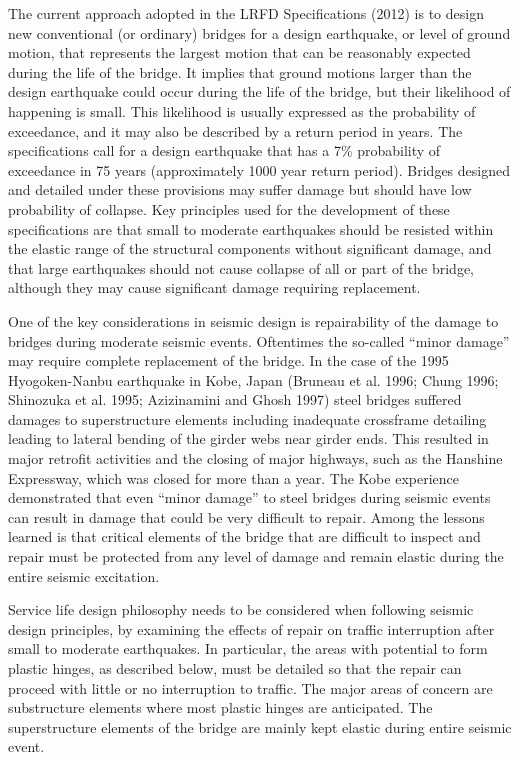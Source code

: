 The current approach adopted in the LRFD Specifications (2012) is to design new conventional (or ordinary)
bridges for a design earthquake, or level of ground motion, that represents the largest motion that can be reasonably
expected during the life of the bridge. It implies that ground motions larger than the design earthquake could occur
during the life of the bridge, but their likelihood of happening is small. This likelihood is usually expressed as the
probability of exceedance, and it may also be described by a return period in years. The specifications call for a
design earthquake that has a 7\% probability of exceedance in 75 years (approximately 1000 year return period).
Bridges designed and detailed under these provisions may suffer damage but should have low probability of collapse.
Key principles used for the development of these specifications are that small to moderate earthquakes should be
resisted within the elastic range of the structural components without significant damage, and that large earthquakes
should not cause collapse of all or part of the bridge, although they may cause significant damage requiring
replacement.

One of the key considerations in seismic design is repairability of the damage to bridges during moderate seismic
events. Oftentimes the so-called “minor damage” may require complete replacement of the bridge. In the case of the
1995 Hyogoken-Nanbu earthquake in Kobe, Japan (Bruneau et al. 1996; Chung 1996; Shinozuka et al. 1995;
Azizinamini and Ghosh 1997) steel bridges suffered damages to superstructure elements including inadequate crossframe
detailing leading to lateral bending of the girder webs near girder ends. This resulted in major retrofit activities and the closing of major highways, such as the Hanshine Expressway, which was closed for more than a year. The
Kobe experience demonstrated that even “minor damage” to steel bridges during seismic events can result in damage
that could be very difficult to repair. Among the lessons learned is that critical elements of the bridge that are difficult
to inspect and repair must be protected from any level of damage and remain elastic during the entire seismic
excitation.

Service life design philosophy needs to be considered when following seismic design principles, by examining
the effects of repair on traffic interruption after small to moderate earthquakes. In particular, the areas with potential
to form plastic hinges, as described below, must be detailed so that the repair can proceed with little or no
interruption to traffic. The major areas of concern are substructure elements where most plastic hinges are
anticipated. The superstructure elements of the bridge are mainly kept elastic during entire seismic event.

